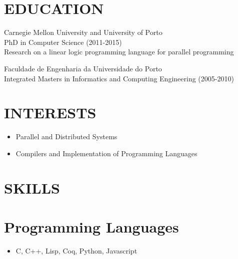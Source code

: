 \documentclass[margin]{res}
\begin{document}

\address{Albisstrasse, 8 \\ 8134 Adliswil, ZH, Switzerland}

\begin{resume}

\section{EDUCATION}

                Carnegie Mellon University and University of Porto \\
                PhD in Computer Science (2011-2015) \\
                Research on a linear logic programming language for parallel
                programming

Faculdade de Engenharia da Universidade do Porto \\
                Integrated Masters in Informatics and Computing Engineering (2005-2010) \\

\section{INTERESTS}

                 \begin{itemize}
                    \item Parallel and Distributed Systems
                    \item Compilers and Implementation of Programming Languages
                 \end{itemize}
                  
\section{SKILLS} 
\normalsize{\section{Programming Languages}}
                 \begin{itemize}
                 \item C, C++, Lisp, Coq, Python, Javascript
                 \end{itemize}
                 

\end{resume}
\end{document}
